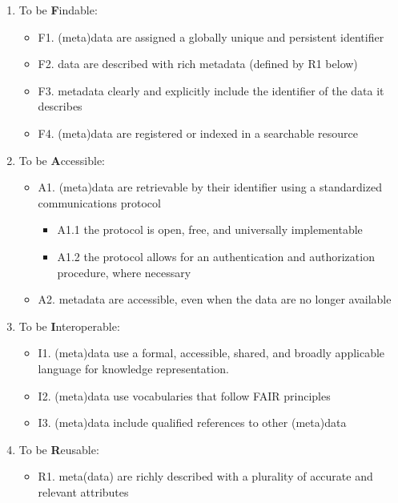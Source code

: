 \documentclass[
]{book}
\providecommand{\tightlist}{%
  \setlength{\itemsep}{0pt}\setlength{\parskip}{0pt}}
\begin{document}
\begin{enumerate}
\def\labelenumi{\arabic{enumi}.}
\tightlist
\item
  To be \textbf{F}indable:

  \begin{itemize}
  \tightlist
  \item
    F1. (meta)data are assigned a globally unique and persistent identifier
  \item
    F2. data are described with rich metadata (defined by R1 below)
  \item
    F3. metadata clearly and explicitly include the identifier of the data it describes
  \item
    F4. (meta)data are registered or indexed in a searchable resource
  \end{itemize}
\item
  To be \textbf{A}ccessible:

  \begin{itemize}
  \tightlist
  \item
    A1. (meta)data are retrievable by their identifier using a standardized communications protocol

    \begin{itemize}
    \tightlist
    \item
      A1.1 the protocol is open, free, and universally implementable
    \item
      A1.2 the protocol allows for an authentication and authorization procedure, where necessary
    \end{itemize}
  \item
    A2. metadata are accessible, even when the data are no longer available
  \end{itemize}
\item
  To be \textbf{I}nteroperable:

  \begin{itemize}
  \tightlist
  \item
    I1. (meta)data use a formal, accessible, shared, and broadly applicable language for knowledge representation.
  \item
    I2. (meta)data use vocabularies that follow FAIR principles
  \item
    I3. (meta)data include qualified references to other (meta)data
  \end{itemize}
\item
  To be \textbf{R}eusable:

  \begin{itemize}
  \tightlist
  \item
    R1. meta(data) are richly described with a plurality of accurate and relevant attributes


\end{itemize}
\end{enumerate}
\end{document}
